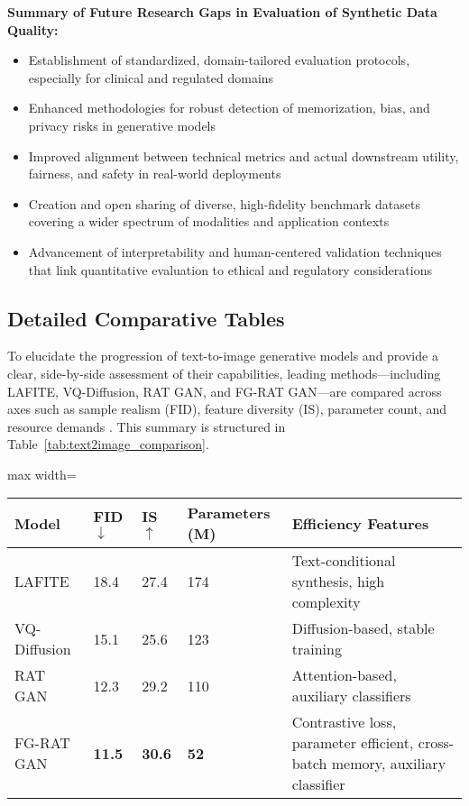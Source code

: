 \documentclass[sigconf]{acmart}
\begin{document}
\textbf{Summary of Future Research Gaps in Evaluation of Synthetic Data Quality:}
\begin{itemize}
    \item Establishment of standardized, domain-tailored evaluation protocols, especially for clinical and regulated domains~\cite{ref89}\cite{ref88}
    \item Enhanced methodologies for robust detection of memorization, bias, and privacy risks in generative models~\cite{ref21}\cite{ref87}
    \item Improved alignment between technical metrics and actual downstream utility, fairness, and safety in real-world deployments~\cite{ref88}\cite{ref1}
    \item Creation and open sharing of diverse, high-fidelity benchmark datasets covering a wider spectrum of modalities and application contexts~\cite{ref89}\cite{ref81}
    \item Advancement of interpretability and human-centered validation techniques that link quantitative evaluation to ethical and regulatory considerations~\cite{ref87}
\end{itemize}

\subsection{Detailed Comparative Tables}

To elucidate the progression of text-to-image generative models and provide a clear, side-by-side assessment of their capabilities, leading methods—including LAFITE, VQ-Diffusion, RAT GAN, and FG-RAT GAN—are compared across axes such as sample realism (FID), feature diversity (IS), parameter count, and resource demands \cite{ref101}. This summary is structured in Table~\ref{tab:text2image_comparison}.

\begin{table*}[htbp]
\centering
\caption{Comparison of leading text-to-image generation models on major metrics.}
\label{tab:text2image_comparison}
\begin{adjustbox}{max width=\textwidth}
\begin{tabular}{lllll}
\toprule
\textbf{Model} & \textbf{FID} $\downarrow$ & \textbf{IS} $\uparrow$ & \textbf{Parameters (M)} & \textbf{Efficiency Features} \\
\midrule
LAFITE      & 18.4    & 27.4   & 174     & Text-conditional synthesis, high complexity \\
VQ-Diffusion& 15.1    & 25.6   & 123     & Diffusion-based, stable training \\
RAT GAN     & 12.3    & 29.2   & 110     & Attention-based, auxiliary classifiers \\
FG-RAT GAN  & \textbf{11.5}    & \textbf{30.6}   & \textbf{52}      & Contrastive loss, parameter efficient, cross-batch memory, auxiliary classifier \\
\bottomrule
\end{tabular}
\end{adjustbox}
\end{table*}
\end{document}
